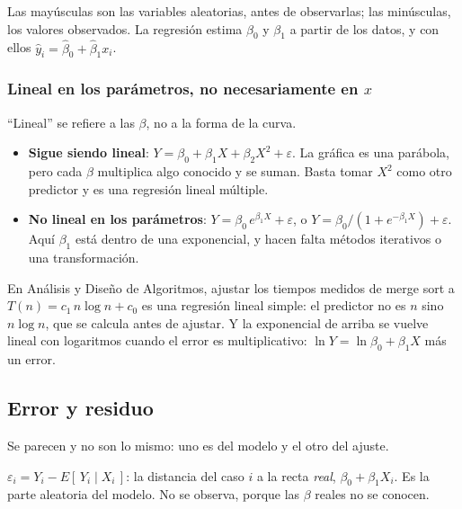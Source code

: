 \documentclass[11pt,letterpaper]{article}
\begin{document}
Las mayúsculas son las variables aleatorias, antes de observarlas; las
minúsculas, los valores observados. La regresión estima $\beta_0$ y
$\beta_1$ a partir de los datos, y con ellos
$\hat{y}_i = \hat{\beta}_0 + \hat{\beta}_1 x_i$.

\subsubsection*{Lineal en los parámetros, no necesariamente en $x$}

``Lineal'' se refiere a las $\beta$, no a la forma de la curva.

\begin{itemize}[itemsep=0.3em]
    \item \textbf{Sigue siendo lineal}:
          $Y = \beta_0 + \beta_1 X + \beta_2 X^2 + \varepsilon$. La
          gráfica es una parábola, pero cada $\beta$ multiplica algo
          conocido y se suman. Basta tomar $X^2$ como otro predictor
          y es una regresión lineal múltiple.
    \item \textbf{No lineal en los parámetros}:
          $Y = \beta_0\, e^{\beta_1 X} + \varepsilon$, o
          $Y = \beta_0 / (1 + e^{-\beta_1 X}) + \varepsilon$. Aquí
          $\beta_1$ está dentro de una exponencial, y hacen falta
          métodos iterativos o una transformación.
\end{itemize}

\begin{idea}
    En Análisis y Diseño de Algoritmos, ajustar los tiempos medidos de
    merge sort a $T(n) = c_1\, n \log n + c_0$ es una regresión lineal
    simple: el predictor no es $n$ sino $n \log n$, que se calcula
    antes de ajustar. Y la exponencial de arriba se vuelve lineal con
    logaritmos cuando el error es multiplicativo:
    $\ln Y = \ln \beta_0 + \beta_1 X$ más un error.
\end{idea}


\subsection*{Error y residuo}

Se parecen y no son lo mismo: uno es del modelo y el otro del ajuste.

\begin{definicion}[Error]
    $\varepsilon_i = Y_i - E[\,Y_i \mid X_i\,]$: la distancia del caso
    $i$ a la recta \emph{real}, $\beta_0 + \beta_1 X_i$. Es la parte
    aleatoria del modelo. No se observa, porque las $\beta$ reales no
    se conocen.
\end{definicion}
\end{document}

